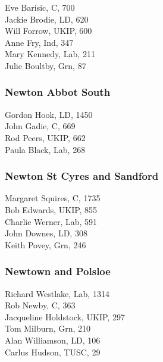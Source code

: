 \documentclass[a4paper,openany,10pt]{book}
\begin{document}
Eve Barisic, C, 700\\
Jackie Brodie, LD, 620\\
Will Forrow, UKIP, 600\\
Anne Fry, Ind, 347\\
Mary Kennedy, Lab, 211\\
Julie Boultby, Grn, 87\\


\subsubsection*{Newton Abbot South}



Gordon Hook, LD, 1450\\
John Gadie, C, 669\\
Rod Peers, UKIP, 662\\
Paula Black, Lab, 268\\


\subsubsection*{Newton St Cyres and Sandford}



Margaret Squires, C, 1735\\
Bob Edwards, UKIP, 855\\
Charlie Werner, Lab, 591\\
John Downes, LD, 308\\
Keith Povey, Grn, 246\\


\subsubsection*{Newtown and Polsloe}



Richard Westlake, Lab, 1314\\
Rob Newby, C, 363\\
Jacqueline Holdstock, UKIP, 297\\
Tom Milburn, Grn, 210\\
Alan Williamson, LD, 106\\
Carlus Hudson, TUSC, 29\\
\end{document}
